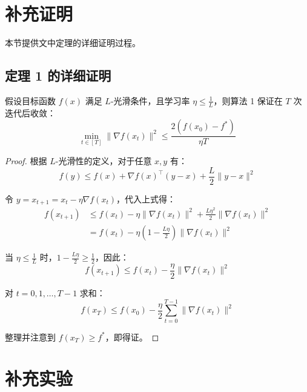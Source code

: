 \documentclass[macnew, cn]{manuscript}
\begin{document}
\section{补充证明}
\label{app:proof}

本节提供文中定理的详细证明过程。

\subsection{定理 1 的详细证明}

\begin{theorem}[收敛性定理]
\label{thm:convergence}
    假设目标函数 $f(x)$ 满足 $L$-光滑条件，且学习率 $\eta \leq \frac{1}{L}$，则算法 1 保证在 $T$ 次迭代后收敛：
    \begin{equation}
        \min_{t \in [T]} \|\nabla f(x_t)\|^2 \leq \frac{2(f(x_0) - f^*)}{\eta T}
    \end{equation}
\end{theorem}

\begin{proof}
    根据 $L$-光滑性的定义，对于任意 $x, y$ 有：
    \begin{equation}
        f(y) \leq f(x) + \nabla f(x)^\top(y-x) + \frac{L}{2}\|y-x\|^2
    \end{equation}
    
    令 $y = x_{t+1} = x_t - \eta \nabla f(x_t)$，代入上式得：
    \begin{align}
        f(x_{t+1}) &\leq f(x_t) - \eta \|\nabla f(x_t)\|^2 + \frac{L\eta^2}{2}\|\nabla f(x_t)\|^2 \\
        &= f(x_t) - \eta\left(1 - \frac{L\eta}{2}\right)\|\nabla f(x_t)\|^2
    \end{align}
    
    当 $\eta \leq \frac{1}{L}$ 时，$1 - \frac{L\eta}{2} \geq \frac{1}{2}$，因此：
    \begin{equation}
        f(x_{t+1}) \leq f(x_t) - \frac{\eta}{2}\|\nabla f(x_t)\|^2
    \end{equation}
    
    对 $t = 0, 1, \ldots, T-1$ 求和：
    \begin{equation}
        f(x_T) \leq f(x_0) - \frac{\eta}{2}\sum_{t=0}^{T-1}\|\nabla f(x_t)\|^2
    \end{equation}
    
    整理并注意到 $f(x_T) \geq f^*$，即得证。
\end{proof}

\section{补充实验}
\label{app:experiment}
\end{document}
